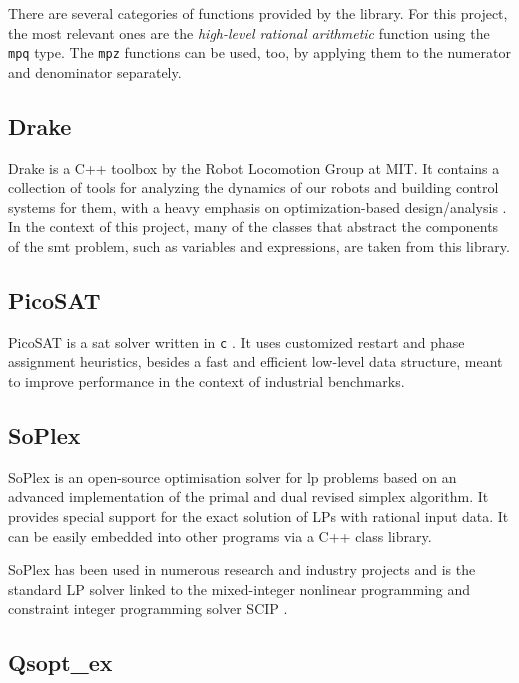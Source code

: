 There are several categories of functions provided by the library.
For this project, the most relevant ones are the \textit{high-level rational arithmetic} function using the \texttt{mpq} type.
The \texttt{mpz} functions can be used, too, by applying them to the numerator and denominator separately.

\subsection*{Drake}

Drake is a C++ toolbox by the Robot Locomotion Group at MIT.
It contains a collection of tools for analyzing the dynamics of our robots and building control systems for them, with a heavy emphasis on optimization-based design/analysis \cite{paper:drake}.
In the context of this project, many of the classes that abstract the components of the \gls{smt} problem, such as variables and expressions, are taken from this library.

\subsection*{PicoSAT}

PicoSAT is a \gls{sat} solver written in \texttt{c} \cite{paper:picosat}.
It uses customized restart and phase assignment heuristics, besides a fast and efficient low-level data structure, meant to improve performance in the context of industrial benchmarks.

\subsection*{SoPlex}

SoPlex is an open-source optimisation solver for \gls{lp} problems based on an advanced implementation of the primal and dual revised simplex algorithm.
It provides special support for the exact solution of LPs with rational input data.
It can be easily embedded into other programs via a C++ class library.

SoPlex has been used in numerous research and industry projects and is the standard LP solver linked to the mixed-integer nonlinear programming and constraint integer programming solver SCIP \cite{man:soplex}.

\subsection*{Qsopt\_ex}

